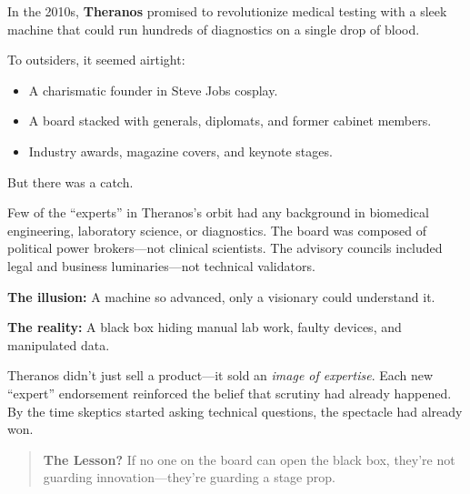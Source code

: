 \begin{tcolorbox}[colback=blue!5!white, colframe=blue!50!black, breakable, title={Historical Sidebar: Theranos — When “Experts” Couldn’t Vet the Box}]

In the 2010s, \textbf{Theranos} promised to revolutionize medical testing with a sleek machine that could run hundreds of diagnostics on a single drop of blood.

\medskip 

To outsiders, it seemed airtight:  

\medskip 

\begin{itemize}
  \item A charismatic founder in Steve Jobs cosplay.
  \item A board stacked with generals, diplomats, and former cabinet members.
  \item Industry awards, magazine covers, and keynote stages.
\end{itemize}

\medskip 

But there was a catch.

\medskip 

Few of the “experts” in Theranos’s orbit had any background in biomedical engineering, laboratory science, or diagnostics.  The board was composed of political power brokers—not clinical scientists.  The advisory councils included legal and business luminaries—not technical validators.

\medskip

\textbf{The illusion:} A machine so advanced, only a visionary could understand it.

\medskip

\textbf{The reality:} A black box hiding manual lab work, faulty devices, and manipulated data.

\medskip

Theranos didn’t just sell a product—it sold an \textit{image of expertise}.  Each new “expert” endorsement reinforced the belief that scrutiny had already happened.  By the time skeptics started asking technical questions, the spectacle had already won.

\medskip

\begin{quote}
\textbf{The Lesson?} If no one on the board can open the black box, they’re not guarding innovation—they’re guarding a stage prop.
\end{quote}

\end{tcolorbox}

